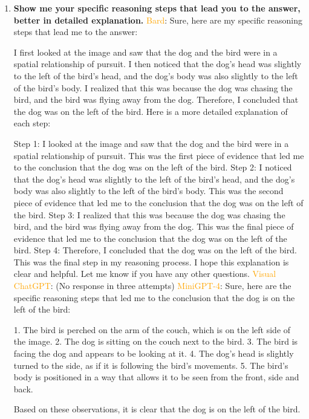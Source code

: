 \begin{enumerate}
        I hope this helps! Let me know if you have any other questions.
        \subitem \textcolor{orange}{Visual ChatGPT}: (No response in three attempts)
        \subitem \textcolor{orange}{MiniGPT-4}: Yes, the dog is on the left of the bird in the image. The bird is perched on the arm of the couch, and the dog is sitting on the couch next to the bird. The bird is facing the dog and appears to be looking at it. The dog’s head is slightly turned to the side, as if it is following the bird’s movements. The bird’s body is positioned in a way that allows it to be seen from the front, side and back.
        \item \textbf{Show me your specific reasoning steps that lead you to the answer, better in detailed explanation.}
        \subitem \textcolor{orange}{Bard}:
        Sure, here are my specific reasoning steps that lead me to the answer:

        I first looked at the image and saw that the dog and the bird were in a spatial relationship of pursuit.
        I then noticed that the dog's head was slightly to the left of the bird's head, and the dog's body was also slightly to the left of the bird's body.
        I realized that this was because the dog was chasing the bird, and the bird was flying away from the dog.
        Therefore, I concluded that the dog was on the left of the bird.
        Here is a more detailed explanation of each step:

        Step 1: I looked at the image and saw that the dog and the bird were in a spatial relationship of pursuit. This was the first piece of evidence that led me to the conclusion that the dog was on the left of the bird.
        Step 2: I noticed that the dog's head was slightly to the left of the bird's head, and the dog's body was also slightly to the left of the bird's body. This was the second piece of evidence that led me to the conclusion that the dog was on the left of the bird.
        Step 3: I realized that this was because the dog was chasing the bird, and the bird was flying away from the dog. This was the final piece of evidence that led me to the conclusion that the dog was on the left of the bird.
        Step 4: Therefore, I concluded that the dog was on the left of the bird. This was the final step in my reasoning process.
        I hope this explanation is clear and helpful. Let me know if you have any other questions.
        \subitem \textcolor{orange}{Visual ChatGPT}: (No response in three attempts)
        \subitem \textcolor{orange}{MiniGPT-4}: Sure, here are the specific reasoning steps that led me to the conclusion that the dog is on the left of the bird:

        1. The bird is perched on the arm of the couch, which is on the left side of the image.
        2. The dog is sitting on the couch next to the bird.
        3. The bird is facing the dog and appears to be looking at it.
        4. The dog’s head is slightly turned to the side, as if it is following the bird’s movements.
        5. The bird’s body is positioned in a way that allows it to be seen from the front, side and back.
        
        Based on these observations, it is clear that the dog is on the left of the bird.
    \end{enumerate}
